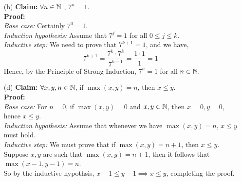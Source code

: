 \documentclass[11pt]{article}
\newif\ifsolutions
\begin{document}
\begin{qunlist}
\begin{itemize}
\item[(b)]\textbf{Claim:} $\forall n \in \mathbb{N}$ , $7^n = 1$. \\
\textbf{Proof:} \\
\textit{Base case:} Certainly $7^0 = 1$. \\
\textit{Induction hypothesis:} Assume that $7^j = 1$ for all $0\leq j \leq k$.\\
\textit{Inductive step:} We need to prove that $7^{k+1} = 1$, and we have,
\[ 7^{k+1} = \frac{7^k \cdot 7^k}{7^{k-1}} = \frac{1 \cdot 1}{1} = 1\]
Hence, by the Principle of Strong Induction, $7^n = 1$ for all $n \in \mathbb{N}$.

\ifsolutions
\textbf{Solutions:} The claim is clearly false as $7 \ne 1$, so there must be an error in the proof.
The (strong) induction hypothesis is stated correctly, however, not all required base cases are checked.
The inductive step uses both $P(k)$ and $P(k-1)$ to prove $P(k+1)$, which breaks down for $k=0$.
When $k=0$, $k-1 = -1$ and $P(k-1)=P(-1)$ is not defined!
\fi




\item[(d)]\textbf{Claim:} $\forall x,y,n \in \mathbb{N}$, if $\max(x,y) = n$, then $x \leq y$. \\
\textbf{Proof:} \\
\textit{Base case:} For $n=0$, if $\max(x,y) = 0$ and $x,y \in \mathbb{N}$, then $x=0, y=0$, hence $x \leq y$. \\
\textit{Induction hypothesis:} Assume that whenever we have $\max(x,y) = n$, $x \leq y$ must hold. \\
\textit{Inductive step:} We must prove that if $\max(x,y) = n+1$, then $x \leq y$. \\
Suppose $x,y$ are such that $\max(x,y) = n+1$, then it follows that $\max(x-1,y-1) = n$. \\
So by the inductive hypothsis, $x-1 \leq y-1  \implies x \leq y$, completing the proof.


\end{itemize}
\end{qunlist}
\end{document}
